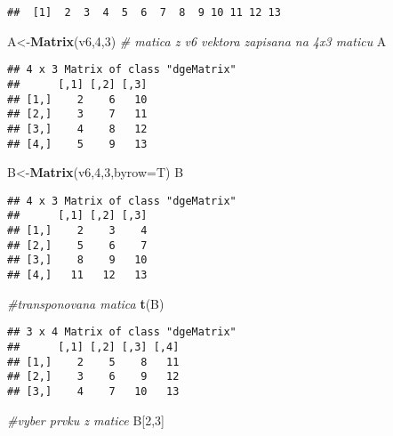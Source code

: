 \documentclass[
]{article}
\newenvironment{Shaded}{\begin{snugshade}}{\end{snugshade}}
\newcommand{\AttributeTok}[1]{\textcolor[rgb]{0.13,0.29,0.53}{#1}}
\newcommand{\CommentTok}[1]{\textcolor[rgb]{0.56,0.35,0.01}{\textit{#1}}}
\newcommand{\DecValTok}[1]{\textcolor[rgb]{0.00,0.00,0.81}{#1}}
\newcommand{\FunctionTok}[1]{\textcolor[rgb]{0.13,0.29,0.53}{\textbf{#1}}}
\newcommand{\NormalTok}[1]{#1}
\newcommand{\OtherTok}[1]{\textcolor[rgb]{0.56,0.35,0.01}{#1}}
\begin{document}
\begin{verbatim}
##  [1]  2  3  4  5  6  7  8  9 10 11 12 13
\end{verbatim}

\begin{Shaded}
\begin{Highlighting}[]
\NormalTok{A}\OtherTok{\textless{}{-}}\FunctionTok{Matrix}\NormalTok{(v6,}\DecValTok{4}\NormalTok{,}\DecValTok{3}\NormalTok{) }\CommentTok{\# matica z v6 vektora zapisana na 4x3 maticu}
\NormalTok{A}
\end{Highlighting}
\end{Shaded}

\begin{verbatim}
## 4 x 3 Matrix of class "dgeMatrix"
##      [,1] [,2] [,3]
## [1,]    2    6   10
## [2,]    3    7   11
## [3,]    4    8   12
## [4,]    5    9   13
\end{verbatim}

\begin{Shaded}
\begin{Highlighting}[]
\NormalTok{B}\OtherTok{\textless{}{-}}\FunctionTok{Matrix}\NormalTok{(v6,}\DecValTok{4}\NormalTok{,}\DecValTok{3}\NormalTok{,}\AttributeTok{byrow=}\NormalTok{T)}
\NormalTok{B}
\end{Highlighting}
\end{Shaded}

\begin{verbatim}
## 4 x 3 Matrix of class "dgeMatrix"
##      [,1] [,2] [,3]
## [1,]    2    3    4
## [2,]    5    6    7
## [3,]    8    9   10
## [4,]   11   12   13
\end{verbatim}

\begin{Shaded}
\begin{Highlighting}[]
\CommentTok{\#transponovana matica}
\FunctionTok{t}\NormalTok{(B)}
\end{Highlighting}
\end{Shaded}

\begin{verbatim}
## 3 x 4 Matrix of class "dgeMatrix"
##      [,1] [,2] [,3] [,4]
## [1,]    2    5    8   11
## [2,]    3    6    9   12
## [3,]    4    7   10   13
\end{verbatim}

\begin{Shaded}
\begin{Highlighting}[]
\CommentTok{\#vyber prvku z matice}
\NormalTok{B[}\DecValTok{2}\NormalTok{,}\DecValTok{3}\NormalTok{]}
\end{Highlighting}
\end{Shaded}
\end{document}
